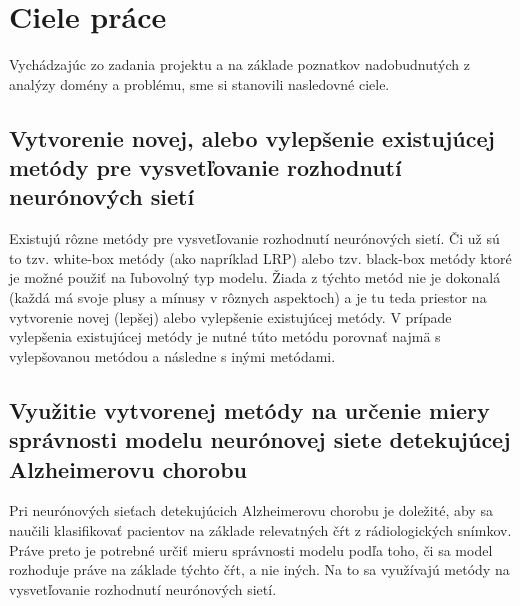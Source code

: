 \chapter{Ciele práce \label{sec:goals}}

Vychádzajúc zo zadania projektu a na základe poznatkov nadobudnutých z analýzy domény a problému, sme si stanovili nasledovné ciele.

\section{Vytvorenie novej, alebo vylepšenie existujúcej metódy pre vysvetľovanie rozhodnutí neurónových sietí \label{sec:goals_1}} 

Existujú rôzne metódy pre vysvetľovanie rozhodnutí neurónových sietí. Či už sú to tzv. white-box metódy (ako napríklad LRP) alebo tzv. black-box metódy ktoré je možné použiť na ľubovolný typ modelu. Žiada z týchto metód nie je dokonalá (každá má svoje plusy a mínusy v rôznych aspektoch) a je tu teda priestor na vytvorenie novej (lepšej) alebo vylepšenie existujúcej metódy. V prípade vylepšenia existujúcej metódy je nutné túto metódu porovnať najmä s vylepšovanou metódou a následne s inými metódami.

\section{Využitie vytvorenej metódy na určenie miery správnosti modelu neurónovej siete detekujúcej Alzheimerovu chorobu \label{sec:goals_2}}

Pri neurónových sieťach detekujúcich Alzheimerovu chorobu je doležité, aby sa naučili klasifikovať pacientov na základe relevatných čŕt z rádiologických snímkov. Práve preto je potrebné určiť mieru správnosti modelu podľa toho, či sa model rozhoduje práve na základe týchto čŕt, a nie iných. Na to sa využívajú metódy na vysvetľovanie rozhodnutí neurónových sietí.
